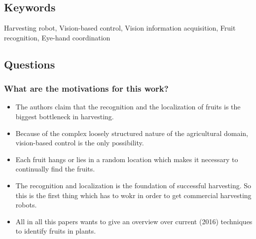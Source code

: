\subsection*{Keywords}
Harvesting robot, Vision-based control, Vision information acquisition, Fruit recognition, Eye-hand coordination


\subsection*{Questions}
\subsubsection*{What are the motivations for this work?}
\begin{itemize}
    \item The authors claim that the recognition and the localization of fruits is the biggest bottleneck in harvesting.
    \item Because of the complex loosely structured nature of the agricultural domain, vision-based control is the only possibility.
    \item Each fruit hangs or lies in a random location which makes it necessary to continually find the fruits. 
    \item The recognition and localization is the foundation of successful harvesting. So this is the first thing which has to wokr in order to get commercial harvesting robots. 
    \item All in all this papers wants to give an overview over current (2016) techniques to identify fruits in plants.
\end{itemize}
